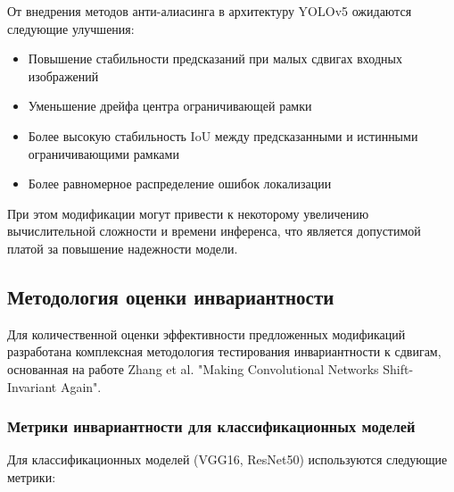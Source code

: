 От внедрения методов анти-алиасинга в архитектуру YOLOv5 ожидаются следующие улучшения:
\begin{itemize}
    \item Повышение стабильности предсказаний при малых сдвигах входных изображений
    \item Уменьшение дрейфа центра ограничивающей рамки
    \item Более высокую стабильность IoU между предсказанными и истинными ограничивающими рамками
    \item Более равномерное распределение ошибок локализации
\end{itemize}

При этом модификации могут привести к некоторому увеличению вычислительной сложности и времени инференса, что является допустимой платой за повышение надежности модели.

\subsection{Методология оценки инвариантности}
\label{sec:evaluation}

Для количественной оценки эффективности предложенных модификаций разработана комплексная методология тестирования инвариантности к сдвигам, основанная на работе Zhang et al. "Making Convolutional Networks Shift-Invariant Again".

\subsubsection{Метрики инвариантности для классификационных моделей}
\label{sec:evaluation:classification}

Для классификационных моделей (VGG16, ResNet50) используются следующие метрики:

